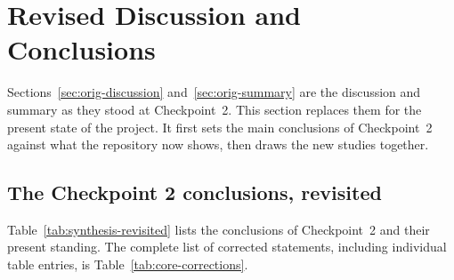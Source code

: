 
\section{Revised Discussion and Conclusions}
\label{sec:synthesis}

Sections~\ref{sec:orig-discussion} and~\ref{sec:orig-summary} are the discussion and summary as they stood at
Checkpoint~2. This section replaces them for the present state of the project. It first sets the main
conclusions of Checkpoint~2 against what the repository now shows, then draws the new studies together.

\subsection{The Checkpoint 2 conclusions, revisited}
\label{sec:synthesis-revisited}

Table~\ref{tab:synthesis-revisited} lists the conclusions of Checkpoint~2 and their present standing. The
complete list of corrected statements, including individual table entries, is
Table~\ref{tab:core-corrections}.

